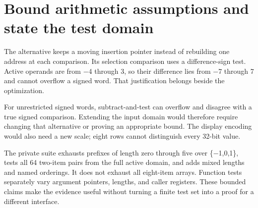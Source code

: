 \section{Bound arithmetic assumptions and state the test
  domain}\label{009-sorting-visualizer-p12-bound-arithmetic-assumptions-and-state-the-test-domain}

The alternative keeps a moving insertion pointer instead of rebuilding
one address at each comparison. Its selection comparison uses a
difference-sign test. Active operands are from \ensuremath{-}4 through 3, so their
difference lies from \ensuremath{-}7 through 7 and cannot overflow a signed word.
That justification belongs beside the optimization.

For unrestricted signed words, subtract-and-test can overflow and
disagree with a true signed comparison. Extending the input domain would
therefore require changing that alternative or proving an appropriate
bound. The display encoding would also need a new scale; eight rows
cannot distinguish every 32-bit value.

The private suite exhausts prefixes of length zero through five over
\{\ensuremath{-}1,0,1\}, tests all 64 two-item pairs from the full active domain, and
adds mixed lengths and named orderings. It does not exhaust all
eight-item arrays. Function tests separately vary argument pointers,
lengths, and caller registers. These bounded claims make the evidence
useful without turning a finite test set into a proof for a different
interface.
